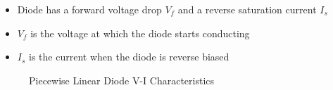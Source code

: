 \begin{definition}
    \begin{itemize}
        \item Diode has a forward voltage drop $V_f$ and a reverse saturation current $I_s$
        \item $V_f$ is the voltage at which the diode starts conducting
        \item $I_s$ is the current when the diode is reverse biased
    \end{itemize}
    \begin{figure}[H]
        \centering
        \caption{Piecewise Linear Diode V-I Characteristics}
    \end{figure}

\end{definition}